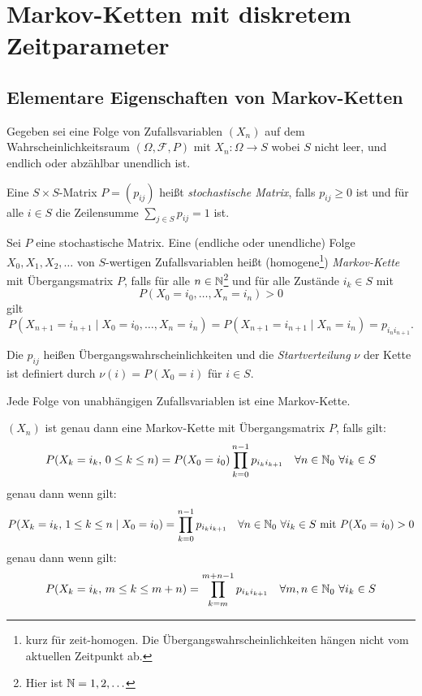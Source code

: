 \documentclass[a4paper,twoside,DIV15,BCOR12mm]{scrbook}
\newcommand{\cF}{\mathcal{F}}
\begin{document}
\setcounter{chapter}{0}
\renewcommand{\thesection}{\arabic{section}}
\renewcommand{\thechapter}{\Roman{chapter}}

\chapter{Markov-Ketten mit diskretem Zeitparameter}

\section{Elementare Eigenschaften von Markov-Ketten}

Gegeben sei eine Folge von Zufallsvariablen $(X_n)$ auf dem Wahrscheinlichkeitsraum $(\Omega, \cF, P)$ mit $X_n:\Omega \to S$ wobei $S$ nicht leer, und endlich oder abzählbar unendlich ist.

\begin{definition}
Eine $S\times S$-Matrix $P=(p_{ij})$ heißt \emph{stochastische Matrix}, falls $p_{ij}\ge0$ ist und für alle $i\in S$ die Zeilensumme $\sum_{j\in S} p_{ij} = 1$ ist.
\end{definition}

\begin{definition}
Sei $P$ eine stochastische Matrix. Eine (endliche oder unendliche) Folge $X_0, X_1, X_2,\ldots$ von $S$-wertigen Zufallsvariablen heißt (homogene\footnote{kurz für zeit-homogen. Die Übergangswahrscheinlichkeiten hängen nicht vom aktuellen Zeitpunkt ab.}) \emph{Markov-Kette} mit Übergangsmatrix $P$, falls für alle $n\in \mathbb{N}$\footnote{Hier ist $\mathbb{N}=1,2,\ldots$} und für alle Zustände $i_k\in S$ mit 
\[
P(X_0=i_0,\ldots,X_n=i_n) >0
\]
gilt
\[
P(X_{n+1} = i_{n+1} \mid X_0 = i_0, \ldots, X_n=i_n) = 
P(X_{n+1} = i_{n+1} \mid X_n=i_n) = p_{i_n i_{n+1}}.
\]

Die $p_{ij}$ heißen Übergangswahrscheinlichkeiten und die \emph{Startverteilung} $\nu$ der Kette ist definiert durch $\nu(i)=P(X_0=i)$ für $i\in S$.
\end{definition}

\begin{bemerkung}
Jede Folge von unabhängigen Zufallsvariablen ist eine Markov-Kette.
\end{bemerkung}

\begin{satz}
$(X_n)$ ist genau dann eine Markov-Kette mit Übergangsmatrix $P$, falls gilt:
\[
P(X_k = i_k,\, 0\le k\le n) = P(X_0 = i_0)\prod_{k=0}^{n-1} p_{i_k i_{k+1}} \quad \forall n\in \mathbb{N}_0 \ \forall i_k\in S
\]
genau dann wenn gilt:
\[
P(X_k = i_k,\, 1\le k\le n \mid X_0=i_0) = \prod_{k=0}^{n-1} p_{i_k i_{k+1}} \quad \forall n\in \mathbb{N}_0 \ \forall i_k\in S\text{ mit $P(X_0=i_0)>0$}
\]
genau dann wenn gilt:
\[
P(X_k = i_k,\,m\le k\le m+n) = \prod_{k=m}^{m+n-1} p_{i_k i_{k+1}} \quad \forall m,n\in \MdN_0 \ \forall i_k\in S
\]
\end{satz}
\end{document}
